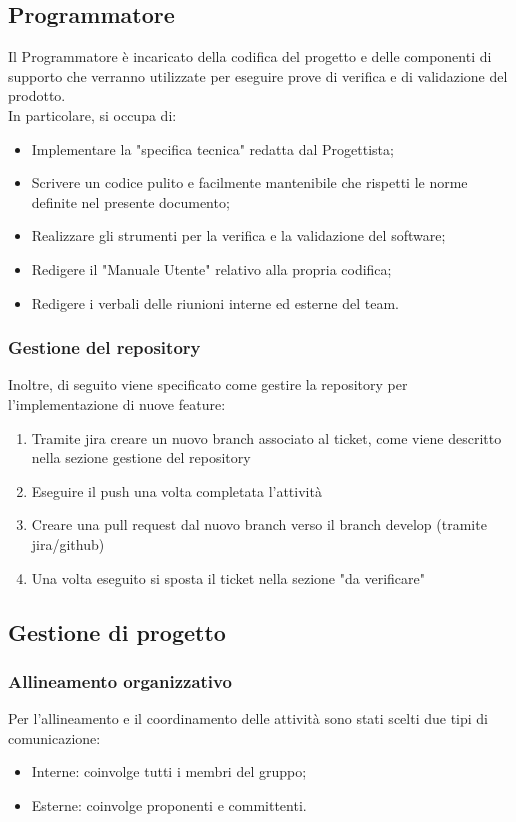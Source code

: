 \subsection{Programmatore}
Il Programmatore è incaricato della codifica del progetto e delle componenti di supporto che verranno utilizzate per eseguire prove di verifica e di validazione del prodotto. \\
In particolare, si occupa di:
\begin{itemize}
    \item Implementare la "specifica tecnica" redatta dal Progettista;
    \item Scrivere un codice pulito e facilmente mantenibile che rispetti le norme definite nel presente documento;
    \item Realizzare gli strumenti per la verifica e la validazione del software;
    \item Redigere il "Manuale Utente" relativo alla propria codifica;
    \item Redigere i verbali delle riunioni interne ed esterne del team.
\end{itemize}
\subsubsection{Gestione del repository}
Inoltre, di seguito viene specificato come gestire la repository per l'implementazione di nuove feature:
\begin{enumerate}
    \item Tramite jira creare un nuovo branch associato al ticket, come viene descritto nella sezione gestione del repository
    \item Eseguire il push una volta completata l'attività
    \item Creare una pull request dal nuovo branch verso il branch develop (tramite jira/github)
    \item Una volta eseguito si sposta il ticket nella sezione "da verificare"
\end{enumerate}
\subsection{Gestione di progetto}
\subsubsection{Allineamento organizzativo}
Per l'allineamento e il coordinamento delle attività sono stati scelti due tipi di comunicazione:
\begin{itemize}
    \item Interne: coinvolge tutti i membri del gruppo;
    \item Esterne: coinvolge proponenti e committenti.
\end{itemize}

